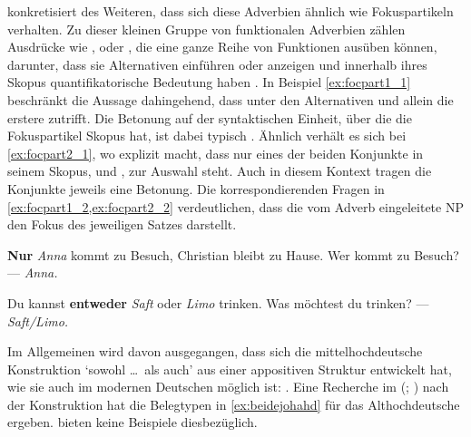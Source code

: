 \citet[425--428]{johannessen2005} konkretisiert des Weiteren, dass sich diese
Adverbien ähnlich wie Fokuspartikeln verhalten. Zu dieser kleinen Gruppe von
funktionalen Adverbien zählen Ausdrücke wie ,  oder
, die eine ganze Reihe von Funktionen ausüben können, darunter, dass
sie Alternativen einführen oder anzeigen und innerhalb ihres Skopus
quantifikatorische Bedeutung haben \autocite[vgl.][1--4, 15]{koenig1991}. In
Beispiel \cref{ex:focpart1_1} beschränkt  die Aussage dahingehend, dass
unter den Alternativen  und  allein die erstere
zutrifft. Die Betonung auf der syntaktischen Einheit, über die die
Fokuspartikel Skopus hat, ist dabei typisch \autocite[10--14]{koenig1991}.
Ähnlich verhält es sich bei \cref{ex:focpart2_1}, wo  explizit
macht, dass nur eines der beiden Konjunkte in seinem Skopus,  und
, zur Auswahl steht. Auch in diesem Kontext tragen die Konjunkte
jeweils eine Betonung. Die korrespondierenden Fragen in
\cref{ex:focpart1_2,ex:focpart2_2} verdeutlichen, dass die vom Adverb
eingeleitete NP den Fokus des jeweiligen Satzes darstellt.

\begin{exe}
\ex\label{ex:focpart_1}
\begin{xlist}
	\ex \label{ex:focpart1_1}
		\textbf{Nur} \emph{Anna} kommt zu Besuch, Christian bleibt zu
		Hause.
	\ex \label{ex:focpart1_2}
		Wer kommt zu Besuch? --- \emph{Anna.}
\end{xlist}

\ex \begin{xlist}
	\ex \label{ex:focpart2_1}
		Du kannst \textbf{entweder} \emph{Saft} oder \emph{Limo} trinken.
	\ex \label{ex:focpart2_2}
		Was möchtest du trinken? --- \emph{Saft/Limo.}
\end{xlist}
\end{exe}

Im Allgemeinen wird davon ausgegangen, dass sich die mittelhochdeutsche
Konstruktion  `sowohl \dots\ als auch' aus einer
appositiven Struktur entwickelt hat, wie sie auch im modernen Deutschen möglich
ist:  \autocite[vgl.][626--627 und die dortigen
Referenzen]{ksw2}. Eine Recherche im  (;
\nosh\cite{ddd}) nach der Konstruktion   \autocite[vgl.][49]{schuetzeichel2012} hat die Belegtypen in
\cref{ex:beidejohahd} für das Althochdeutsche ergeben.
\citet{braune2018,schrodt2004} bieten keine Beispiele dies\-bezüglich.

